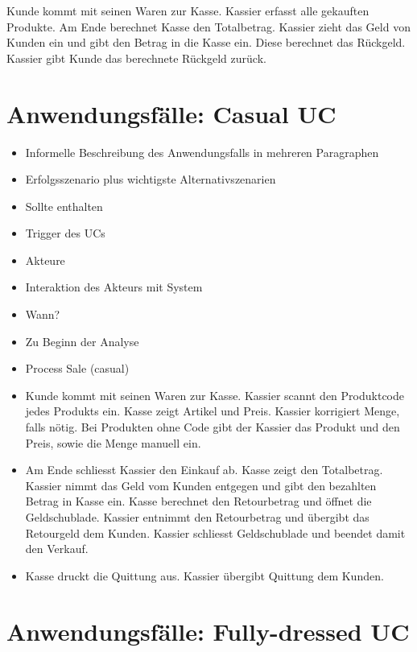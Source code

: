 \documentclass[10pt]{article}
\begin{document}
Kunde kommt mit seinen Waren zur Kasse. Kassier erfasst alle gekauften Produkte. Am Ende berechnet Kasse den Totalbetrag. Kassier zieht das Geld von Kunden ein und gibt den Betrag in die Kasse ein. Diese berechnet das Rückgeld. Kassier gibt Kunde das berechnete Rückgeld zurück.

\section*{Anwendungsfälle: Casual UC}
\begin{itemize}
  \item Informelle Beschreibung des Anwendungsfalls in mehreren Paragraphen
  \item Erfolgsszenario plus wichtigste Alternativszenarien
  \item Sollte enthalten
  \item Trigger des UCs
  \item Akteure
  \item Interaktion des Akteurs mit System
  \item Wann?
  \item Zu Beginn der Analyse
  \item Process Sale (casual)
  \item Kunde kommt mit seinen Waren zur Kasse. Kassier scannt den Produktcode jedes Produkts ein. Kasse zeigt Artikel und Preis. Kassier korrigiert Menge, falls nötig. Bei Produkten ohne Code gibt der Kassier das Produkt und den Preis, sowie die Menge manuell ein.
  \item Am Ende schliesst Kassier den Einkauf ab. Kasse zeigt den Totalbetrag. Kassier nimmt das Geld vom Kunden entgegen und gibt den bezahlten Betrag in Kasse ein. Kasse berechnet den Retourbetrag und öffnet die Geldschublade. Kassier entnimmt den Retourbetrag und übergibt das Retourgeld dem Kunden. Kassier schliesst Geldschublade und beendet damit den Verkauf.
  \item Kasse druckt die Quittung aus. Kassier übergibt Quittung dem Kunden.
\end{itemize}

\section*{Anwendungsfälle: Fully-dressed UC}
\end{document}
